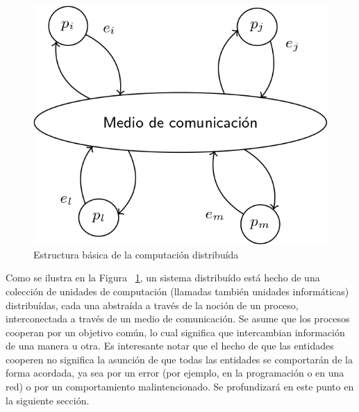 \begin{figure}
  \centering
  \includegraphics[scale=0.25]{figures/distributed-systems.png}
  \caption{Estructura básica de la computación distribuída}
  \label{fig:distributed-systems}
\end{figure}


Como se ilustra en la Figura ~\ref{fig:distributed-systems}, un sistema distribuído está hecho de una
colección de unidades de computación (llamadas también unidades informáticas) distribuídas, cada una
abstraída a través de la noción de un proceso, interconectada a través de un medio de comunicación.
Se asume que los procesos cooperan por un objetivo común, lo cual significa que intercambian
información de una manera u otra. Es interesante notar que el hecho de que las entidades
cooperen no significa la asunción de que todas las entidades se comportarán de la forma
acordada, ya sea por un error (por ejemplo, en la programación o en una red) o por un comportamiento
malintencionado.
Se profundizará en este punto en la siguiente sección. %

